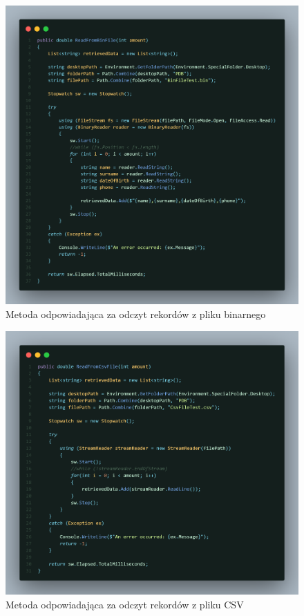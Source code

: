 \documentclass{report}
\begin{document}
\begin{figure}[H]
    \centering
    \includegraphics[width=1.0\textwidth]{src/bin-read.png}
    \caption{Metoda odpowiadająca za odczyt rekordów z pliku binarnego}
\end{figure}

\begin{figure}[H]
    \centering
    \includegraphics[width=1.0\textwidth]{src/csv-read.png}
    \caption{Metoda odpowiadająca za odczyt rekordów z pliku CSV}
\end{figure}
\end{document}
